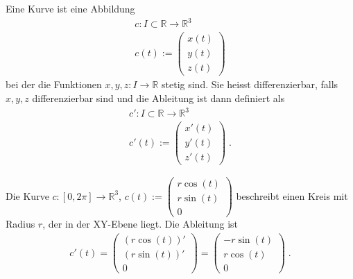 \begin{Definition}
Eine Kurve ist eine  Abbildung 
\begin{align*}
c: I \subset \mathbb{R} \to \mathbb{R}^3 \\
c(t) := \begin{pmatrix} x(t) \\  y(t) \\ z(t) \end{pmatrix}
\end{align*}
bei der die Funktionen $x, y, z : I \to \mathbb{R}$ stetig sind. Sie heisst differenzierbar, falls $x,y,z$ differenzierbar sind und die Ableitung ist dann definiert als 
\begin{align*}
c': I \subset \mathbb{R} \to \mathbb{R}^3 \\
c'(t) := \begin{pmatrix} x'(t) \\  y'(t) \\ z'(t) \end{pmatrix} \; .
\end{align*}
 \end{Definition}

\begin{Beispiel}
Die Kurve 
$c : [0, 2\pi]  \to  \mathbb{R}^3$, $c(t) :=  \begin{pmatrix} r \cos(t) \\ r  \sin(t) \\  0 \end{pmatrix}$
beschreibt einen Kreis mit Radius $r$, der in der XY-Ebene liegt. Die Ableitung ist
\begin{align*}
c'(t) =  \begin{pmatrix} (r \cos(t))' \\  (r\sin(t))' \\  0 \end{pmatrix} = \begin{pmatrix} -r \sin(t) \\ r \cos(t) \\  0 \end{pmatrix} \;.
\end{align*} 
\end{Beispiel}

